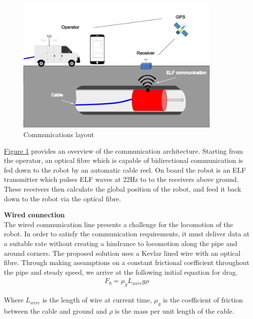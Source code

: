 \documentclass[11pt]{article}		%
\newcommand{\figref}[1]{\hyperref[#1]{Figure \ref*{#1}}}    %
\begin{document}
	        \begin{figure}[h]
				\centering
				\includegraphics[width=0.9\textwidth]{comms layout.pdf}
				\caption{Communications layout}
				\label{commsLayout}
			\end{figure}
	        
	        \figref{commsLayout} provides an overview of the communication architecture. 
	        Starting from the operator, an optical fibre which is capable of bidirectional communication is fed down to the robot by an automatic cable reel. 
	        On board the robot is an ELF transmitter which pulses ELF waves at 22Hz to to the receivers above ground. 
	        These receivers then calculate the global position of the robot, and feed it back down to the robot via the optical fibre.
	       
	        \textbf{Wired connection}
	        \\
	        The wired communication line presents a challenge for the locomotion of the robot. 
	        In order to satisfy the communication requirements, it must deliver data at a suitable rate without creating a hindrance to locomotion along the pipe and around corners. 
	        The proposed solution uses a Kevlar lined wire with an optical fibre. 
	        Through making assumptions on a constant frictional coefficient throughout the pipe and steady speed, we arrive at the following initial equation for drag. 
	        \begin{align}
					F_0 = \mu_g L_{wire}   g \rho
			\end{align}
	        
	        Where $L_{wire}$ is the length of wire at current time, $\mu_g$ is the coefficient of friction between the cable and ground and $\rho$ is the mass per unit length of the cable.
	        
\end{document}
